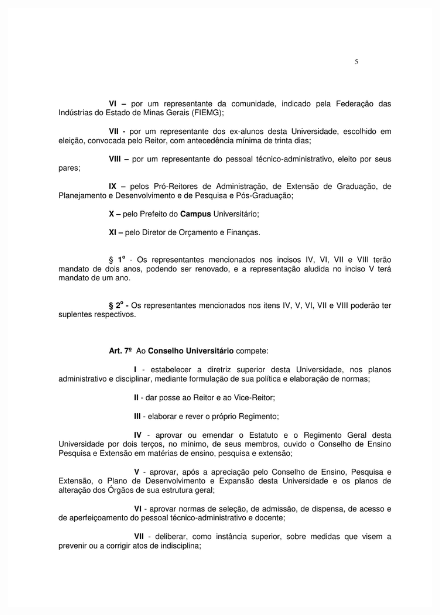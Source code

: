 \begin{figure}[p]
	\centering 
	\includegraphics[scale=0.7]{capitulos/resolucoes/cuni414/cuni414-5.pdf}
\end{figure} \pagebreak

